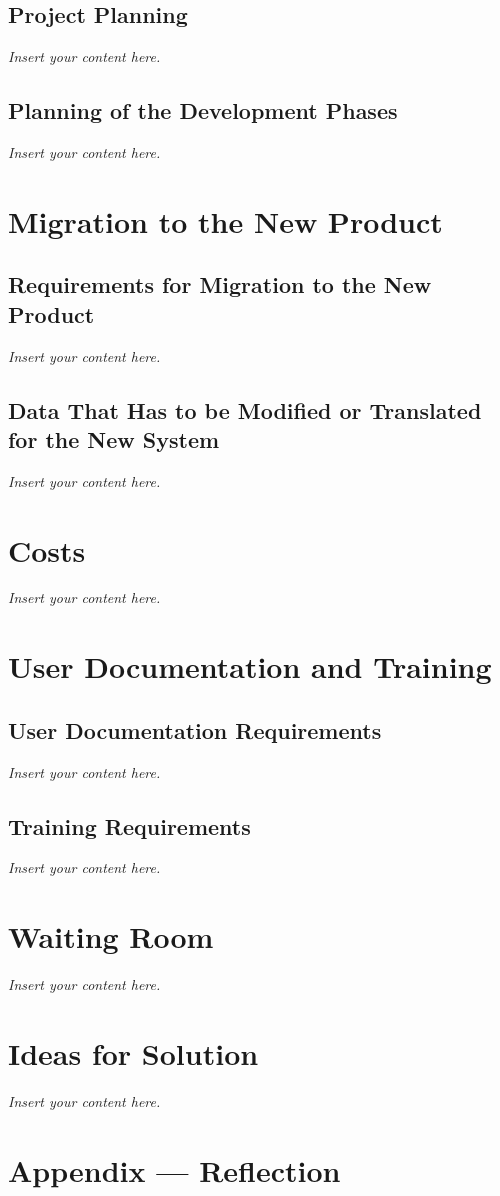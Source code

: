 \documentclass[12pt]{article}
\newcommand{\lips}{\textit{Insert your content here.}}
\begin{document}
\subsection{Project Planning}
\lips
\subsection{Planning of the Development Phases}
\lips

\section{Migration to the New Product}
\subsection{Requirements for Migration to the New Product}
\lips
\subsection{Data That Has to be Modified or Translated for the New System}
\lips

\section{Costs}
\lips
\section{User Documentation and Training}
\subsection{User Documentation Requirements}
\lips
\subsection{Training Requirements}
\lips

\section{Waiting Room}
\lips

\section{Ideas for Solution}
\lips

\newpage{}
\section*{Appendix --- Reflection}
\end{document}
